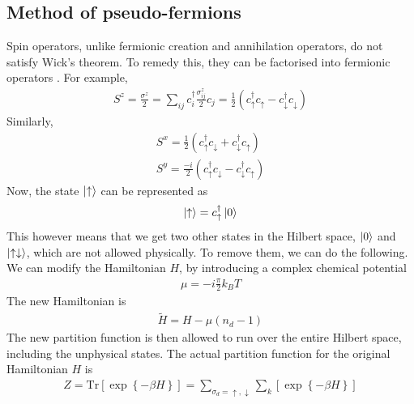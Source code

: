 \documentclass[twoside,11pt]{report}
\numberwithin{equation}{section}
\begin{document}
\subsection{Method of pseudo-fermions}
Spin operators, unlike fermionic creation and annihilation operators,  do not satisfy Wick's theorem.
To remedy this, they can be factorised into fermionic operators \cite{abrikosov}.
For example,
\begin{equation}\begin{aligned}
	S^z = \frac{\sigma^z}{2} = \sum_{ij} c^\dagger_i \frac{\sigma^z_{ij}}{2} c_j = \frac{1}{2}\left(c^\dagger_\uparrow c_\uparrow - c^\dagger_\downarrow c_\downarrow\right)
\end{aligned}\end{equation}
Similarly,
\begin{equation}\begin{aligned}
	S^x = \frac{1}{2}\left(c^\dagger_\uparrow c_\downarrow + c^\dagger_\downarrow c_\uparrow\right)\\
	S^y = \frac{-i}{2}\left(c^\dagger_\uparrow c_\downarrow - c^\dagger_\downarrow c_\uparrow\right)
\end{aligned}\end{equation}
Now, the state \(\ket{\uparrow}\) can be represented as
\begin{equation}\begin{aligned}
\ket{\uparrow} = c^\dagger_\uparrow \ket{0}
\end{aligned}\end{equation}
This however means that we get two other states in the Hilbert space, \(\ket{0}\) and \(\ket{\uparrow\downarrow}\), which are not allowed physically.
To remove them, we can do the following.
We can modify the Hamiltonian \(H\), by introducing a complex chemical potential \cite{poppov}
\begin{equation}\begin{aligned}
\mu = -i\frac{\pi}{2}k_B T
\end{aligned}\end{equation}
The new Hamiltonian is
\begin{equation}\begin{aligned}
\widetilde H = H -\mu (n_d - 1)
\end{aligned}\end{equation}
The new partition function is then allowed to run over the entire Hilbert space, including the unphysical states.
The actual partition function for the original Hamiltonian \(H\) is
\begin{equation}\begin{aligned}
	Z = \text{Tr}\left[\exp\left\{-\beta H\right\}\right] = \sum_{\sigma_d = \uparrow,\downarrow}\sum_{k}\left[\exp\left\{-\beta H\right\}\right]
\end{aligned}\end{equation}
\end{document}
